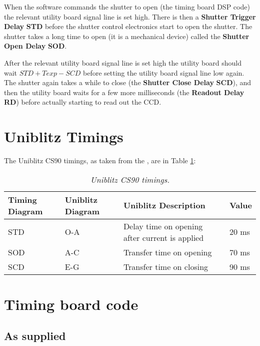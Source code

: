 \documentclass[10pt,a4paper]{article}
\begin{document}
When the software commands the shutter to open (the timing board DSP code) the relevant utility board signal line is set high. There is then a {\bf Shutter Trigger Delay} {\bf STD} before the shutter control electronics start to open the 
shutter. The shutter takes a long time to open (it is a mechanical device) called the {\bf Shutter Open Delay} {\bf SOD}. 

After the relevant utility board signal line is set high the utility board should wait {\bf $STD + Texp - SCD$} before
setting the utility board signal line low again. The shutter again takes a while to close (the {\bf Shutter Close Delay} {\bf SCD}), and then the utility board waits for a few more milliseconds (the {\bf Readout Delay} {\bf RD}) before actually starting to read out the CCD.

\section{Uniblitz Timings}

The Uniblitz CS90 timings, as taken from the \cite{bib:uniblitzcs90spec}, are in Table \ref{tab:uniblitzcs90time}:

\begin{table}[!h]
\begin{center}
\begin{tabular}{|l|l|p{15em}|l|}
\hline
{\bf Timing Diagram} & {\bf Uniblitz Diagram} & {\bf Uniblitz Description} & {\bf Value} \\ \hline
STD                  & O-A		      & Delay time on opening after current is applied & 20 ms \\ 
SOD                  & A-C                    & Transfer time on opening                       & 70 ms \\ 
SCD                  & E-G                    & Transfer time on closing                       & 90 ms \\ \hline
\end{tabular}
\end{center}
\caption{\em Uniblitz CS90 timings.}
\label{tab:uniblitzcs90time}
\end{table}

\section{Timing board code}

\subsection{As supplied}
\end{document}
